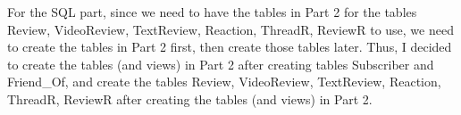 \documentclass{article}
\begin{document}
For the SQL part, since we need to have the tables in Part 2 for the tables
Review, VideoReview, TextReview, Reaction, ThreadR, ReviewR to use, we need to
create the tables in Part 2 first, then create those tables later. Thus, I
decided to create the tables (and views) in Part 2 after creating tables
Subscriber and Friend\_Of, and create the tables Review, VideoReview,
TextReview, Reaction, ThreadR, ReviewR after creating the tables (and views) in
Part 2.
\end{document}
